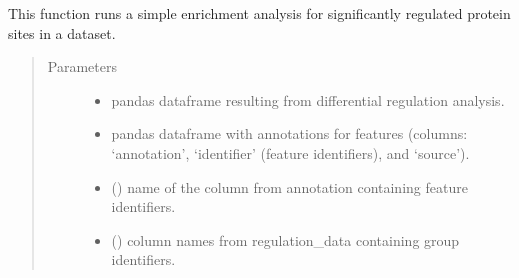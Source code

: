 \documentclass[letterpaper,10pt,english]{sphinxmanual}
\begin{document}

\begin{fulllineitems}
\label{\detokenize{_autosummary/analytics_core.analytics:analytics_core.analytics.analytics.run_site_regulation_enrichment}}
This function runs a simple enrichment analysis for significantly regulated protein sites in a dataset.
\begin{quote}\begin{description}
\item[{Parameters}] \leavevmode\begin{itemize}
\item {} 
 \textendash{} pandas dataframe resulting from differential regulation analysis.

\item {} 
 \textendash{} pandas dataframe with annotations for features (columns: ‘annotation’, ‘identifier’ (feature identifiers), and ‘source’).

\item {} 
 () \textendash{} name of the column from annotation containing feature identifiers.

\item {} 
 () \textendash{} column names from regulation\_data containing group identifiers.


\end{itemize}
\end{description}
\end{quote}
\end{fulllineitems}
\end{document}
